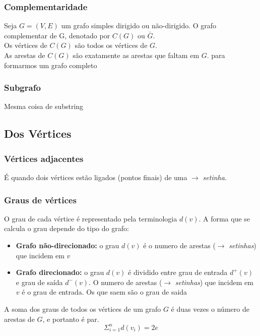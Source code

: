 \documentclass[12pt]{article}
\begin{document}
\subsubsection{Complementaridade}
Seja $G = (V, E)$ um grafo simples dirigido ou não-dirigido. O grafo complementar de G, denotado por $C(G)$ ou $\bar{G}$.\\
Os vértices de $C(G)$ são todos os vértices de $G$.\\
As arestas de $C(G)$ são exatamente as arestas que faltam em $G$.
para formarmos um grafo completo

\subsubsection{Subgrafo}
Mesma coisa de substring

\subsection{Dos Vértices}

\subsubsection{Vértices adjacentes}
É quando dois vértices estão ligados (pontos finais) de uma $\longrightarrow$ \textit{setinha}.

\subsubsection{Graus de vértices}
O grau de cada vértice é representado pela terminologia $d(v)$.
A forma que se calcula o grau depende do tipo do grafo:
\begin{itemize}
	\item \textbf{Grafo não-direcionado:} o grau $d(v)$ é o numero de arestas ($\longrightarrow$ \textit{setinhas}) que incidem em $v$
	\item \textbf{Grafo direcionado:} o grau $d(v)$ é dividido entre grau de entrada $d^+(v)$ e grau de saída $d^-(v)$.
	      O numero de arestas ($\longrightarrow$ \textit{setinhas}) que incidem em $v$ é o grau de entrada.
	      Os que saem são o grau de saida
\end{itemize}

A soma dos graus de todos os vértices de um grafo $G$ é duas vezes o número de arestas de $G$, e portanto é par.
\begin{equation}
	\Sigma_{i=1}^n d(v_i) = 2e
\end{equation}
\end{document}
